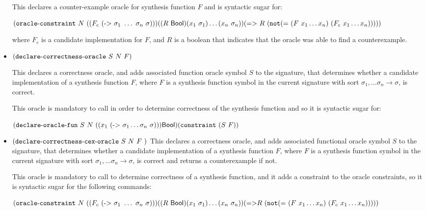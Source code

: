 \documentclass[english,a4paper,10pt]{article}
\begin{document}
\begin{itemize}
This declares a counter-example oracle for synthesis function $F$ and is syntactic sugar for:

${\tt (}{\tt oracle\mbox{-}constraint}\mbox{ } N\mbox{ }
{\tt (}{\tt (}F_c \mbox{ } {\tt (}{\tt \mbox{->}} \mbox{ } \sigma_1 \mbox{ } \ldots \mbox{ } \sigma_n \mbox{ } \sigma{\tt )}{\tt )}{\tt )}
{\tt (}{\tt (}R \mbox{ } \mathsf{Bool}{\tt )} {\tt (}x_1\mbox{ }\sigma_1{\tt )} \ldots {\tt (}x_n\mbox{ }\sigma_n{\tt )} {\tt )} \\
{\tt (}{\tt \mbox{=>}} \mbox{ } R  \mbox{ } {\tt (}{\tt not} {\tt (}{\tt=}\mbox{ } {\tt (}F \mbox{ } x_1 \ldots x_n{\tt )} \mbox{ } {\tt (}F_c \mbox{ }x_1 \ldots x_n {\tt )}{\tt )}{\tt )}{\tt )}{\tt )}
$

where $F_c$ is a candidate implementation for $F$, and $R$ is a boolean that indicates that the oracle was able to find a counterexample.


\item${\tt (}{\tt declare\mbox{-}correctness\mbox{-}oracle}\mbox{ }S\mbox{ }N\mbox{ } F{\tt )} $

This declares a correctness oracle, and adds associated function oracle symbol $S$ to the signature, that determines whether a candidate implementation of a synthesis function $F$,
where $F$ is a synthesis function symbol in the current signature
with sort $\sigma_1, \ldots \sigma_n \rightarrow \sigma$, is correct. 


This oracle is mandatory to call in order to determine correctness of the synthesis function and so it is syntactic sugar for:

$\paren{\oracledeckwd\mbox{ }S\mbox{ }N\mbox{ }\paren{\paren{
x_1\mbox{ }
\paren{
\funsortkwd \mbox{ } \sigma_1 \ldots \sigma_n\mbox{ }\sigma }}}
\sbool}\\
%
\paren{\constraintkwd \mbox{ } \paren{S \mbox{ } F}}
$


\item${\tt (}{\tt declare\mbox{-}correctness\mbox{-}cex\mbox{-}oracle}\mbox{ }S\mbox{ }N\mbox{ } F\mbox{ }{\tt )} $
This declares a correctness oracle, and adds associated functional oracle symbol $S$ to the signature, that determines whether a candidate implementation of a synthesis function $F$,
where $F$ is a synthesis function symbol in the current signature
with sort $\sigma_1, \ldots \sigma_n \rightarrow \sigma$, is correct and returns a counterexample if not.

This oracle is mandatory to call to determine correctness of a synthesis function, and it adds a constraint to the oracle constraints, so it is syntactic sugar for the following commands:

$
{\tt (}{\tt oracle\mbox{-}constraint}\mbox{ } N\mbox{ }
{\tt (}{\tt (}F_c \mbox{ } {\tt (}{\tt \mbox{->}} \mbox{ } \sigma_1 \mbox{ } \ldots \mbox{ } \sigma_n \mbox{ } \sigma{\tt )}{\tt )}{\tt )}
{\tt (}{\tt (}R \mbox{ } \mathsf{Bool}{\tt )} {\tt (}x_1\mbox{ }\sigma_1{\tt )} \ldots {\tt (}x_n\mbox{ }\sigma_n{\tt )} {\tt )} \\
{\tt (}{\tt \mbox{=>}} R  \mbox{ } {\tt (}{\tt not} {\tt (}{\tt=}\mbox{ } {\tt (}F \mbox{ } x_1 \ldots x_n{\tt )} \mbox{ } {\tt (}F_c \mbox{ }x_1 \ldots x_n {\tt )}{\tt )}{\tt )}{\tt )}{\tt )} \\
$


\end{itemize}
\end{document}
